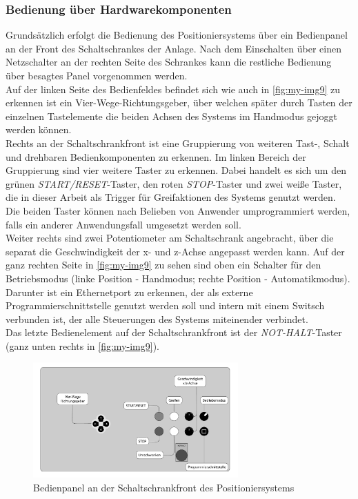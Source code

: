 \documentclass[../../../Bachelorarbeit.tex]{subfiles}
\begin{document}
\subsubsection{Bedienung über Hardwarekomponenten}
Grundsätzlich erfolgt die Bedienung des Positioniersystems über ein Bedienpanel an der Front des Schaltschrankes der Anlage. Nach dem Einschalten über einen Netzschalter an der rechten Seite des Schrankes kann die restliche Bedienung über besagtes Panel vorgenommen werden.\\
Auf der linken Seite des Bedienfeldes befindet sich wie auch in \autoref{fig:my-img9} zu erkennen ist ein Vier-Wege-Richtungsgeber, über welchen später durch Tasten der einzelnen Tastelemente die beiden Achsen des Systems im Handmodus gejoggt werden können.\\
Rechts an der Schaltschrankfront ist eine Gruppierung von weiteren Tast-, Schalt und drehbaren Bedienkomponenten zu erkennen. Im linken Bereich der Gruppierung sind vier weitere Taster zu erkennen. Dabei handelt es sich um den grünen \textit{START/RESET}-Taster, den roten \textit{STOP}-Taster und zwei weiße Taster, die in dieser Arbeit als Trigger für Greifaktionen des Systems genutzt werden. Die beiden Taster können nach Belieben von Anwender umprogrammiert werden, falls ein anderer Anwendungsfall umgesetzt werden soll.\\
Weiter rechts sind zwei Potentiometer am Schaltschrank angebracht, über die separat die Geschwindigkeit der x- und z-Achse angepasst werden kann. Auf der ganz rechten Seite in \autoref{fig:my-img9} zu sehen sind oben ein Schalter für den Betriebsmodus (linke Position - Handmodus; rechte Position - Automatikmodus). Darunter ist ein Ethernetport zu erkennen, der als externe Programmierschnittstelle genutzt werden soll und intern mit einem Switsch verbunden ist, der alle Steuerungen des Systems miteinender verbindet.\\
Das letzte Bedienelement auf der Schaltschrankfront ist der \textit{NOT-HALT}-Taster (ganz unten rechts in \autoref{fig:my-img9}).

\begin{figure}[H]
    \centering
    \includegraphics[width=0.7\textwidth]{Images/SchaltschrankFront.pdf}
    \caption[Bedienpanel]{Bedienpanel an der Schaltschrankfront des Positioniersystems}
    \label{fig:my-img9}
\end{figure}
\end{document}
